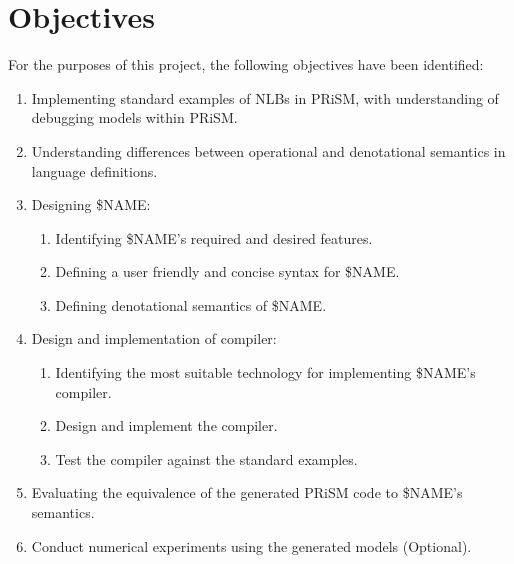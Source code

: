 \documentclass[11pt, a4paper]{article}
\begin{document}
\section{Objectives} %
\label{sec:objectives}
For the purposes of this project, the following objectives have been identified:
\begin{enumerate}
    \item Implementing standard examples of NLBs in PRiSM, with understanding of
    debugging models within PRiSM.
    \item Understanding differences between operational and denotational
    semantics in language definitions.
    \item Designing \$NAME:
    \begin{enumerate}
        \item Identifying \$NAME's required and desired features.
        \item Defining a user friendly and concise syntax for \$NAME.
        \item Defining denotational semantics of \$NAME.
    \end{enumerate}
    \item Design and implementation of compiler:
    \begin{enumerate}
        \item Identifying the most suitable technology for implementing \$NAME's
        compiler.
        \item Design and implement the compiler.
        \item Test the compiler against the standard examples.
    \end{enumerate}
    \item Evaluating the equivalence of the generated PRiSM code to \$NAME's
    semantics.
    \item Conduct numerical experiments using the generated models (Optional).
\end{enumerate}

\end{document}
